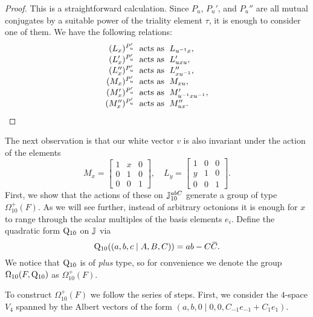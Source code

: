 \begin{proof}
	This is a straightforward calculation. Since $P_u$, $P_u'$, and $P_u''$ are all mutual conjugates by a suitable power of the triality element
	$\tau$, it is enough to consider one of them. We have 
	the following relations:
	\begin{equation}
		\begin{array}{r@{\;}c@{\;}l}
			(L_x)^{P_u'} & \text{ acts as } & L_{u^{-1} x}, \\
			(L_x')^{P_u'} & \text{ acts as } & L_{u x u}', \\
			(L_x'')^{P_u'} & \text{ acts as } & L_{x u^{-1}}'', \\
			(M_x)^{P_u'} & \text{ acts as } & M_{x u}, \\
			(M_x')^{P_u'} & \text{ acts as } & M_{u^{-1} x u^{-1}}', \\
			(M_x'')^{P_u'} & \text{ acts as } & M_{u x}''.
		\end{array}
	\end{equation} \qedhere
\end{proof}
\noindent The next observation is that our white vector $v$ is also invariant under the action of the
elements
    \begin{equation}
        M_x = \begin{bmatrix}
            1&x&0\\
            0&1&0\\
            0&0&1
        \end{bmatrix},\quad 
        L_y = \begin{bmatrix}
            1&0&0\\
            y&1&0\\
            0&0&1
        \end{bmatrix}.
    \end{equation}
First, we show that the actions of these on $\mathbb{J}_{10}^{abC}$ generate a group 
of type $\Omega_{10}^+(F)$. As we will see further, instead of arbitrary octonions
it is enough for $x$ to range through the scalar multiples of the basis elements $e_i$.
Define the quadratic form $\mathord{\mathrm{Q}}_{10}$ on $\mathbb{J}$ via
\begin{equation}
	\mathord{\mathrm{Q}}_{10}((a,b,c\mid A,B,C)) = ab - C\mathord{\mbox{\hspace*{0pt}}\,\overline{\!C\!\!\;}\!\:}\mbox{\hspace*{0pt}}. 
\end{equation}
We notice that $\mathord{\mathrm{Q}}_{10}$ is of \textit{plus} type, so for convenience we
denote the group $\Omega_{10}(F,\mathord{\mathrm{Q}}_{10})$ as $\Omega_{10}^+(F)$. 

To construct $\Omega_{10}^+(F)$ we follow the series of steps. First, we consider the
$4$-space $V_4$ spanned by the Albert vectors of the form 
\mbox{$(a,b,0\mid 0,0,C_{-1}e_{-1} + C_1 e_1)$}. 

